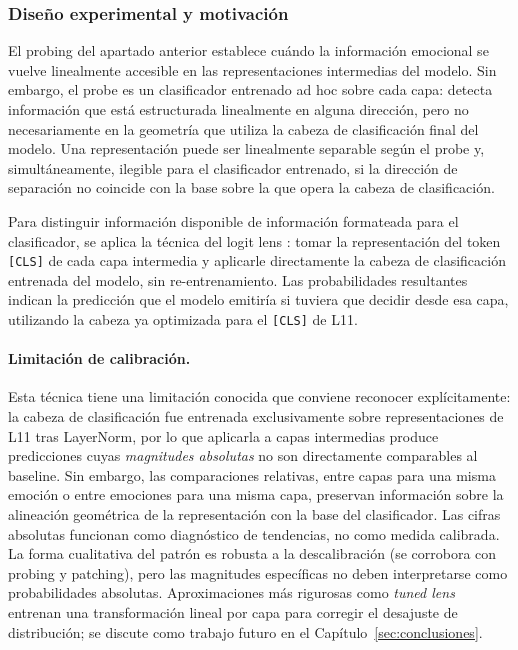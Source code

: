 \subsubsection{Diseño experimental y motivación}

El probing del apartado anterior establece cuándo la información
emocional se vuelve linealmente accesible en las representaciones
intermedias del modelo. Sin embargo, el probe es un clasificador
entrenado ad hoc sobre cada capa: detecta información que está
estructurada linealmente en alguna dirección, pero no
necesariamente en la geometría que utiliza la cabeza de clasificación
final del modelo. Una representación puede ser linealmente separable
según el probe y, simultáneamente, ilegible para el clasificador
entrenado, si la dirección de separación no coincide con la base sobre
la que opera la cabeza de clasificación.

Para distinguir información disponible de información
formateada para el clasificador, se aplica la técnica del logit
lens \cite{nostalgebraist2020logit}: tomar la representación del token
\texttt{[CLS]} de cada capa intermedia y aplicarle directamente la
cabeza de clasificación entrenada del modelo, sin re-entrenamiento. Las
probabilidades resultantes indican la predicción que el modelo emitiría
si tuviera que decidir desde esa capa, utilizando la cabeza ya
optimizada para el \texttt{[CLS]} de L11.

\paragraph{Limitación de calibración.}
Esta técnica tiene una limitación conocida que conviene reconocer
explícitamente: la cabeza de clasificación fue entrenada exclusivamente
sobre representaciones de L11 tras LayerNorm, por lo que aplicarla a
capas intermedias produce predicciones cuyas \emph{magnitudes
absolutas} no son directamente comparables al baseline. Sin embargo,
las comparaciones relativas, entre capas para una misma
emoción o entre emociones para una misma capa, preservan información
sobre la alineación geométrica de la representación con la base del
clasificador. Las cifras absolutas funcionan como diagnóstico de tendencias, no como medida calibrada. La forma cualitativa del patrón es robusta a la
descalibración (se corrobora con probing y patching), pero las
magnitudes específicas no deben interpretarse como probabilidades
absolutas. Aproximaciones más rigurosas como \textit{tuned
lens}~\cite{belrose2023eliciting} entrenan una transformación lineal
por capa para corregir el desajuste de distribución; se discute como
trabajo futuro en el Capítulo~\ref{sec:conclusiones}.

